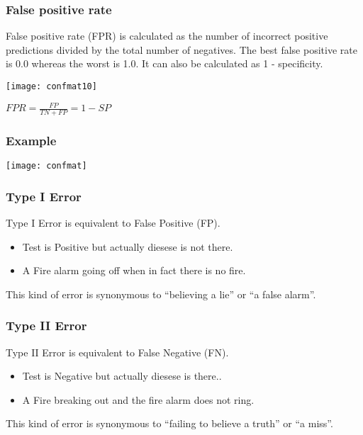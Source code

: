 \begin{frame}[fragile]\frametitle{False positive rate}
False positive rate (FPR) is calculated as the number of incorrect positive predictions
divided by the total number of negatives. The best false positive rate is 0.0 whereas
the worst is 1.0. It can also be calculated as 1 - specificity.

\begin{center}
\texttt{[image: confmat10]}
\end{center}

$FPR  = \frac{FP}{TN+FP} = 1 - SP$
\end{frame}




\begin{frame}[fragile]\frametitle{Example}
\begin{center}
\texttt{[image: confmat]}
\end{center}
\end{frame}

\begin{frame}[fragile]\frametitle{Type I Error}
Type I Error is equivalent to False Positive (FP).
	\begin{itemize}
	\item Test is Positive but actually diesese is not there.
	\item A Fire alarm going off when in fact there is no fire. 
	\end{itemize}
This kind of error is synonymous to ``believing a lie'' or ``a false alarm''.
\end{frame}

\begin{frame}[fragile]\frametitle{Type II Error}
Type II Error is equivalent to False Negative (FN). 

	\begin{itemize}
	\item Test is Negative but actually diesese is there..
	\item A Fire breaking out and the fire alarm does not ring. 
	\end{itemize}
This kind of error is synonymous to ``failing to believe a truth'' or ``a miss''.
\end{frame}

